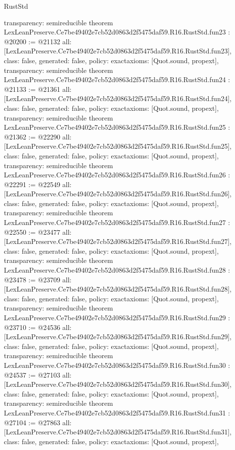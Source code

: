 \begin{lexlean}{RustStd}
\begin{coremodule}
{  transparency: semireducible
}
theorem LexLeanPreserve.Ce7be49402e7cb52d0863d2f5475daf59.R16.RustStd.fun23 : @20200 := @21132 {
  all: [LexLeanPreserve.Ce7be49402e7cb52d0863d2f5475daf59.R16.RustStd.fun23],
  class: false,
  generated: false,
  policy: exact{axioms: [Quot.sound, propext]},
  transparency: semireducible
}
theorem LexLeanPreserve.Ce7be49402e7cb52d0863d2f5475daf59.R16.RustStd.fun24 : @21133 := @21361 {
  all: [LexLeanPreserve.Ce7be49402e7cb52d0863d2f5475daf59.R16.RustStd.fun24],
  class: false,
  generated: false,
  policy: exact{axioms: [Quot.sound, propext]},
  transparency: semireducible
}
theorem LexLeanPreserve.Ce7be49402e7cb52d0863d2f5475daf59.R16.RustStd.fun25 : @21362 := @22290 {
  all: [LexLeanPreserve.Ce7be49402e7cb52d0863d2f5475daf59.R16.RustStd.fun25],
  class: false,
  generated: false,
  policy: exact{axioms: [Quot.sound, propext]},
  transparency: semireducible
}
theorem LexLeanPreserve.Ce7be49402e7cb52d0863d2f5475daf59.R16.RustStd.fun26 : @22291 := @22549 {
  all: [LexLeanPreserve.Ce7be49402e7cb52d0863d2f5475daf59.R16.RustStd.fun26],
  class: false,
  generated: false,
  policy: exact{axioms: [Quot.sound, propext]},
  transparency: semireducible
}
theorem LexLeanPreserve.Ce7be49402e7cb52d0863d2f5475daf59.R16.RustStd.fun27 : @22550 := @23477 {
  all: [LexLeanPreserve.Ce7be49402e7cb52d0863d2f5475daf59.R16.RustStd.fun27],
  class: false,
  generated: false,
  policy: exact{axioms: [Quot.sound, propext]},
  transparency: semireducible
}
theorem LexLeanPreserve.Ce7be49402e7cb52d0863d2f5475daf59.R16.RustStd.fun28 : @23478 := @23709 {
  all: [LexLeanPreserve.Ce7be49402e7cb52d0863d2f5475daf59.R16.RustStd.fun28],
  class: false,
  generated: false,
  policy: exact{axioms: [Quot.sound, propext]},
  transparency: semireducible
}
theorem LexLeanPreserve.Ce7be49402e7cb52d0863d2f5475daf59.R16.RustStd.fun29 : @23710 := @24536 {
  all: [LexLeanPreserve.Ce7be49402e7cb52d0863d2f5475daf59.R16.RustStd.fun29],
  class: false,
  generated: false,
  policy: exact{axioms: [Quot.sound, propext]},
  transparency: semireducible
}
theorem LexLeanPreserve.Ce7be49402e7cb52d0863d2f5475daf59.R16.RustStd.fun30 : @24537 := @27103 {
  all: [LexLeanPreserve.Ce7be49402e7cb52d0863d2f5475daf59.R16.RustStd.fun30],
  class: false,
  generated: false,
  policy: exact{axioms: [Quot.sound, propext]},
  transparency: semireducible
}
theorem LexLeanPreserve.Ce7be49402e7cb52d0863d2f5475daf59.R16.RustStd.fun31 : @27104 := @27863 {
  all: [LexLeanPreserve.Ce7be49402e7cb52d0863d2f5475daf59.R16.RustStd.fun31],
  class: false,
  generated: false,
  policy: exact{axioms: [Quot.sound, propext]},
}
\end{coremodule}
\end{lexlean}
